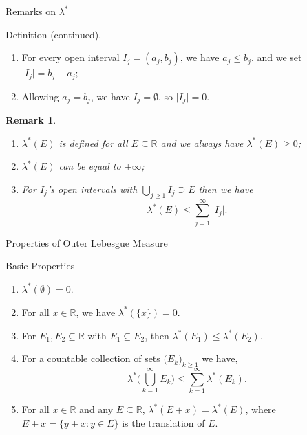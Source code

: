 \documentclass{beamer}
\newtheorem*{remark}{Remark}
\begin{document}
\begin{frame}{Remarks on $\lambda^{*}$}
\begin{block}{Definition (continued).}
\begin{enumerate}
    \item For every open interval $I_{j}=(a_{j},b_{j})$, we have $a_{j}\leq b_{j}$, and we set $\vert I_{j}\vert = b_{j}-a_{j}$;
    \item Allowing $a_{j}=b_{j}$, we have $I_{j}=\emptyset$, so $\vert I_{j}\vert=0$.
\end{enumerate}
\end{block}

\begin{remark}
\begin{enumerate}
    \item $\lambda^{*}(E)$ is defined for all $E\subseteq\mathbb{R}$ and we always have $\lambda^{*}(E)\geq 0$;
    \item $\lambda^{*}(E)$ can be equal to $+\infty$;
    \item For $I_{j}$'s open intervals with $\bigcup_{j\geq 1}I_{j}\supseteq E$ then we have \[\lambda^{*}(E)\leq\sum_{j=1}^{\infty}\vert I_{j}\vert\text{.}\tag{$1$}\label{eqn:(1)}\]
\end{enumerate}
\end{remark}

\end{frame}
    
\begin{frame}{Properties of Outer Lebesgue Measure}
\begin{block}{Basic Properties}
\begin{enumerate}
    \item $\lambda^{*}(\emptyset)=0$.
    \item For all $x\in\mathbb{R}$, we have $\lambda^{*}(\{x\})=0$.
    \item For $E_{1},E_{2}\subseteq\mathbb{R}$ with $E_{1}\subseteq E_{2}$, then $\lambda^{*}(E_{1})\leq \lambda^{*}(E_{2})$.
    \item For a countable collection of sets $\big(E_{k})_{k\geq1}$ we have, $$\lambda^{*}\big(\bigcup_{k=1}^{\infty}E_{k}\big)\leq \sum_{k=1}^{\infty}\lambda^{*}(E_{k}).$$
    \item For all $x\in\mathbb{R}$ and any $E\subseteq\mathbb{R}$, $\lambda^{*}(E+x)=\lambda^{*}(E)$, where $E+x=\{y+x:y\in E\}$ is the translation of $E$.
\end{enumerate}
\end{block}
\end{frame} 
\end{document}
